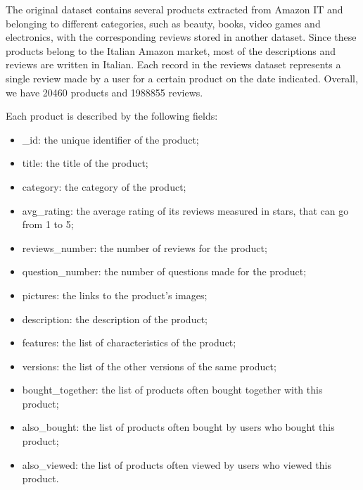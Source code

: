 \documentclass[a4paper,12pt]{article}
\begin{document}
\noindent The original dataset contains several products extracted from Amazon IT and belonging to different categories, such as beauty, books, video games and electronics, with the corresponding reviews stored in another dataset. Since these products belong to the Italian Amazon market, most of the descriptions and reviews are written in Italian. Each record in the reviews dataset represents a single review made by a user for a certain product on the date indicated. Overall, we have 20460 products and 1988855 reviews.

\noindent Each product is described by the following fields:
\begin{itemize}
	\item \_id: the unique identifier of the product;
	\item title: the title of the product;
	\item category: the category of the product;
	\item avg\_rating: the average rating of its reviews measured in stars, that can go from 1 to 5;
	\item reviews\_number: the number of reviews for the product;
	\item question\_number: the number of questions made for the product;
	\item pictures: the links to the product's images;
	\item description: the description of the product;
	\item features: the list of characteristics of the product;
	\item versions: the list of the other versions of the same product;
	\item bought\_together: the list of products often bought together with this product;
	\item also\_bought: the list of products often bought by users who bought this product;
	\item also\_viewed: the list of products often viewed by users who viewed this product.
\end{itemize}
\end{document}
